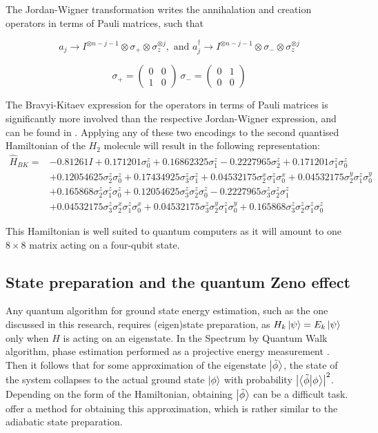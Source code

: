 The Jordan-Wigner transformation writes the annihalation and creation operators in terms of Pauli matrices, such that \cite{daskin}

$$
a_{j} \rightarrow I^{\otimes n-j-1} \otimes \sigma_{+} \otimes \sigma_{z}^{\otimes j}, \text { and } a_{j}^{\dagger} \rightarrow I^{\otimes n-j-1} \otimes \sigma_{-} \otimes \sigma_{z}^{\otimes j}
$$

$$
\sigma_+ = \begin{pmatrix} 0&0\\1&0 \end{pmatrix} \
\sigma_- = \begin{pmatrix} 0&1\\0&0 \end{pmatrix}
$$


The Bravyi-Kitaev expression for the operators in terms of Pauli matrices is significantly more involved than the respective Jordan-Wigner expression, and can be found in \cite{seeley}. Applying any of these two encodings to the second quantised Hamiltonian of the $H_2$ molecule will result in the following representation:
$$
\begin{aligned}
\hat{H}_{B K}=&-0.81261 I+0.171201 \sigma_{0}^{z}+0.16862325 \sigma_{1}^{z}-0.2227965 \sigma_{2}^{z}+0.171201 \sigma_{1}^{z} \sigma_{0}^{z} \\
&+0.12054625 \sigma_{2}^{z} \sigma_{0}^{z}+0.17434925 \sigma_{3}^{z} \sigma_{1}^{z}+0.04532175 \sigma_{2}^{x} \sigma_{1}^{z} \sigma_{0}^{x}+0.04532175 \sigma_{2}^{y} \sigma_{1}^{z} \sigma_{0}^{y} \\
&+0.165868 \sigma_{2}^{z} \sigma_{1}^{z} \sigma_{0}^{z}+0.12054625 \sigma_{3}^{z} \sigma_{2}^{z} \sigma_{0}^{z}-0.2227965 \sigma_{3}^{z} \sigma_{2}^{z} \sigma_{1}^{z} \\
&+0.04532175 \sigma_{3}^{z} \sigma_{2}^{x} \sigma_{1}^{z} \sigma_{0}^{x}+0.04532175 \sigma_{3}^{z} \sigma_{2}^{y} \sigma_{1}^{z} \sigma_{0}^{y}+0.165868 \sigma_{3}^{z} \sigma_{2}^{z} \sigma_{1}^{z} \sigma_{0}^{z}
\end{aligned}
$$

This Hamiltonian is well suited to quantum computers as it will amount to one $8 \times 8$ matrix acting on a four-qubit state.

\subsection{State preparation and the quantum Zeno effect}


Any quantum algorithm for ground state energy estimation, such as the one discussed in this research, requires (eigen)state preparation, as $H_k \left\vert{\psi}\right\rangle = E_k \left\vert{\psi}\right\rangle$ only when $H$ is acting on an eigenstate. In the Spectrum by Quantum Walk algorithm, phase estimation performed as a projective energy measurement \cite{Poulin}. Then it follows that for some approximation of the eigenstate $\left\vert{\tilde{\phi}}\right\rangle$, the state of the system collapses to the actual ground state $\left\vert{\phi}\right\rangle$ with probability $\abs{\braket{\tilde{\phi}}{\phi}}^2$. Depending on the form of the Hamiltonian, obtaining $\left\vert{\tilde{\phi}}\right\rangle$ can be a difficult task. \textcite{poulin} offer a method for obtaining this approximation, which is rather similar to the adiabatic state preparation.

